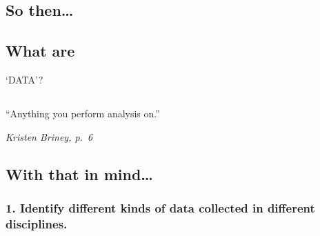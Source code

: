 \documentclass[
  letterpaper,
  DIV=11,
  numbers=noendperiod]{scrartcl}
\begin{document}
\hypertarget{so-then}{%
\subsection{So then\ldots{}}\label{so-then}}

\hypertarget{what-are-1}{%
\subsection{What are}\label{what-are-1}}

`DATA'?

\hypertarget{section-1}{%
\subsection{}\label{section-1}}

\hypertarget{section-2}{%
\subsection{}\label{section-2}}

\hypertarget{section-3}{%
\subsection{}\label{section-3}}

\hypertarget{section-4}{%
\subsection{}\label{section-4}}

\hypertarget{section-5}{%
\subsection{}\label{section-5}}

``Anything you perform analysis on.''

\emph{Kristen Briney, p.~6}

\hypertarget{with-that-in-mind}{%
\subsection{With that in mind\ldots{}}\label{with-that-in-mind}}

\hypertarget{identify-different-kinds-of-data-collected-in-different-disciplines.}{%
\subsubsection{1. Identify different kinds of data collected in
different
disciplines.}\label{identify-different-kinds-of-data-collected-in-different-disciplines.}}
\end{document}
